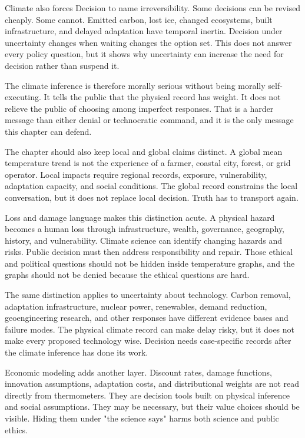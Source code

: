 Climate also forces Decision to name irreversibility. Some decisions can
be revised cheaply. Some cannot. Emitted carbon, lost ice, changed ecosystems,
built infrastructure, and delayed adaptation have temporal inertia. Decision
under uncertainty changes when waiting changes the option set. This does not
answer every policy question, but it shows why uncertainty can increase the
need for decision rather than suspend it.

The climate inference is therefore morally serious without being morally
self-executing. It tells the public that the physical record has weight. It
does not relieve the public of choosing among imperfect responses. That is a
harder message than either denial or technocratic command, and it is the only
message this chapter can defend.

The chapter should also keep local and global claims distinct. A global mean
temperature trend is not the experience of a farmer, coastal city, forest, or
grid operator. Local impacts require regional records, exposure, vulnerability,
adaptation capacity, and social conditions. The global record constrains the
local conversation, but it does not replace local decision. Truth has to
transport again.

Loss and damage language makes this distinction acute. A physical hazard
becomes a human loss through infrastructure, wealth, governance, geography,
history, and vulnerability. Climate science can identify changing hazards and
risks. Public decision must then address responsibility and repair. Those
ethical and political questions should not be hidden inside temperature
graphs, and the graphs should not be denied because the ethical questions are
hard.

The same distinction applies to uncertainty about technology. Carbon removal,
adaptation infrastructure, nuclear power, renewables, demand reduction,
geoengineering research, and other responses have different evidence bases and
failure modes. The physical climate record can make delay risky, but it does
not make every proposed technology wise. Decision needs case-specific records
after the climate inference has done its work.

Economic modeling adds another layer. Discount rates, damage functions,
innovation assumptions, adaptation costs, and distributional weights are not
read directly from thermometers. They are decision tools built on physical
inference and social assumptions. They may be necessary, but their value
choices should be visible. Hiding them under "the science says" harms both
science and public ethics.

